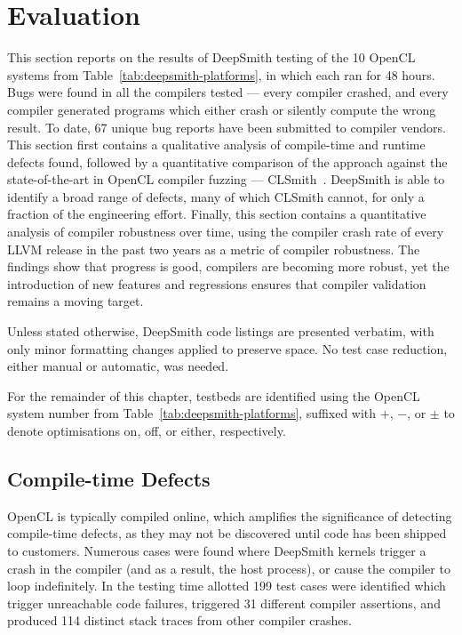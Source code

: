 \section{Evaluation}
\label{sec:deepsmith-eval}



This section reports on the results of DeepSmith testing of the 10 OpenCL systems from Table~\ref{tab:deepsmith-platforms}, in which each ran for 48 hours. Bugs were found in all the compilers tested --- every compiler crashed, and every compiler generated programs which either crash or silently compute the wrong result. To date, 67 unique bug reports have been submitted to compiler vendors. This section first contains a qualitative analysis of compile-time and runtime defects found, followed by a quantitative comparison of the approach against the state-of-the-art in OpenCL compiler fuzzing --- CLSmith~\cite{Lidbury2015a}. DeepSmith is able to identify a broad range of defects, many of which CLSmith cannot, for only a fraction of the engineering effort. Finally, this section contains a quantitative analysis of compiler robustness over time, using the compiler crash rate of every LLVM release in the past two years as a metric of compiler robustness. The findings show that progress is good, compilers are becoming more robust, yet the introduction of new features and regressions ensures that compiler validation remains a moving target.

Unless stated otherwise, DeepSmith code listings are presented verbatim, with only minor formatting changes applied to preserve space. No test case reduction, either manual or automatic, was needed.

For the remainder of this chapter, testbeds are identified using the OpenCL system number from Table~\ref{tab:deepsmith-platforms}, suffixed with $+$, $-$, or $\pm$ to denote optimisations on, off, or either, respectively.

\subsection{Compile-time Defects}%
\label{subsec:compile-time-defects}

OpenCL is typically compiled online, which amplifies the significance of detecting compile-time defects, as they may not be discovered until code has been shipped to customers. Numerous cases were found where DeepSmith kernels trigger a crash in the compiler (and as a result, the host process), or cause the compiler to loop indefinitely. In the testing time allotted 199 test cases were identified which trigger unreachable code failures, triggered 31 different compiler assertions, and produced 114 distinct stack traces from other compiler crashes.

